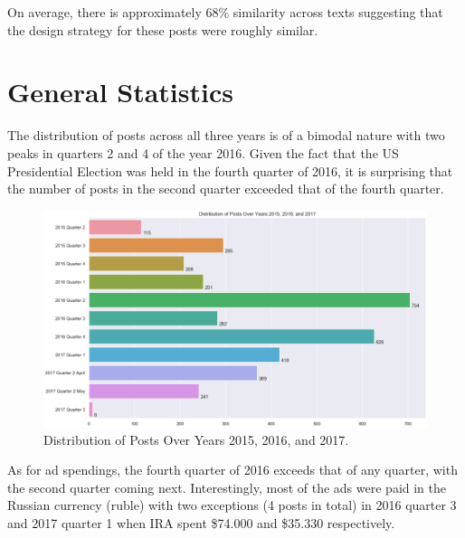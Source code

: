 \documentclass{article}
\begin{document}
On average, there is approximately 68\% similarity across texts suggesting that
the design strategy for these posts were roughly similar.


\section{General Statistics}

The distribution of posts across all three years is of a bimodal nature with
two peaks in quarters 2 and 4 of the year 2016. Given the fact that the US
Presidential Election was held in the fourth quarter of 2016, it is surprising
that the number of posts in the second quarter exceeded that of the fourth
quarter.

\begin{figure}[H]
\centering
\includegraphics[width=\linewidth]{./image/barchart-plots/barchart_distribution_of_posts.png}
\caption{Distribution of Posts Over Years 2015, 2016, and 2017.}
\end{figure}

As for ad spendings, the fourth quarter of 2016 exceeds that of any quarter,
with the second quarter coming next. Interestingly, most of the ads were paid
in the Russian currency (ruble) with two exceptions (4 posts in total) in 2016
quarter 3 and 2017 quarter 1 when IRA spent \$74.000 and \$35.330 respectively.
\end{document}
